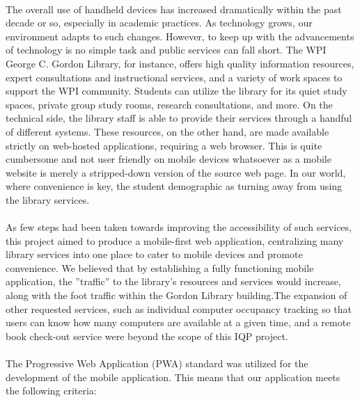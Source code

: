 

\paragraph{}
The overall use of handheld devices has increased dramatically within the past decade or so, especially in academic practices. As technology grows, our environment adapts to such changes. However, to keep up with the advancements of technology is no simple task and public services can fall short. The WPI George C. Gordon Library, for instance, offers high quality information resources, expert consultations and instructional services, and a variety of work spaces to support the WPI community. Students can utilize the library for its quiet study spaces, private group study rooms, research consultations, and more. On the technical side, the library staff is able to provide their services through a handful of different systems. These resources, on the other hand, are made available strictly on web-hosted applications, requiring a web browser. This is quite cumbersome and not user friendly on mobile devices whatsoever as a mobile website is merely a stripped-down version of the source web page. In our world, where convenience is key, the student demographic as turning away from using the library services.

\paragraph{}
As few steps had been taken towards improving the accessibility of such services, this project aimed to produce a mobile-first web application, centralizing many library services into one place to cater to mobile devices and promote convenience. We believed that by establishing a fully functioning mobile application, the ”traffic” to the library’s resources and services would increase, along with the foot traffic within the Gordon Library building.The expansion of other requested services, such as individual computer occupancy tracking so that users can know how many computers are available at a given time, and a remote book check-out service were beyond the scope of this IQP project.

\paragraph{}

    The Progressive Web Application (PWA) standard was utilized for the development of the mobile application. This means that our application meets the following criteria:
    
